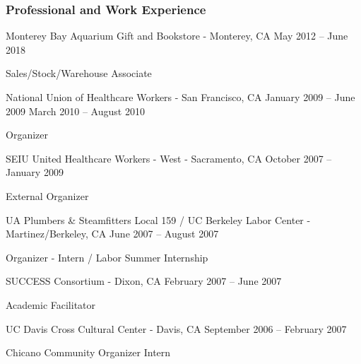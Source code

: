 \documentclass[letterpaper, 10 pt]{article}
\begin{document}
\subsubsection*{Professional and Work Experience}
\noindent
\centerline{Monterey Bay Aquarium Gift and Bookstore - Monterey, CA \hfill May 2012 – June 2018}

Sales/Stock/Warehouse Associate \\
\centerline{National Union of Healthcare Workers - San Francisco, CA \hfill January 2009 – June 2009 \;\vrule\; March 2010 – August 2010}

Organizer \\
\centerline{SEIU United Healthcare Workers - West - Sacramento, CA \hfill October 2007 – January 2009}

External Organizer  \\
\centerline{UA Plumbers \& Steamfitters Local 159 / UC Berkeley Labor Center - Martinez/Berkeley, CA \hfill June 2007 – August 2007}

Organizer - Intern / Labor Summer Internship \\
\centerline{SUCCESS Consortium - Dixon, CA \hfill February 2007 – June 2007}

Academic Facilitator \\
\centerline{UC Davis Cross Cultural Center - Davis, CA \hfill September 2006 – February 2007}

Chicano Community Organizer Intern
\end{document}
